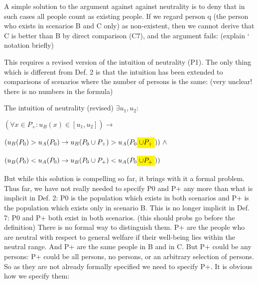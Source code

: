 A simple solution to the argument against against neutrality is to deny that in such cases all people count as existing people. If we regard person q (the person who exists in scenarios B and C only) as non-existent, then we cannot derive that C is better than B by direct comparison (C7), and the argument fails: (explain ‘ notation briefly) 
\begin{comment}
\ \ (C7’)\ \ (A1) ${\wedge}$ (A2) ${\wedge}$ (A3) \ $\Rightarrow $ \ uB(P0) {\textgreater} uC(P0) 

\ \ (C8’)\ \ (C7’) ${\wedge}$ (P1) \ $\Rightarrow $ \ uB(P0 ${\cup}$ P+) {\textgreater} uC(P0 ${\cup}$ P+) 

\ \ (C9’)\ \ (C4) \ $\Leftrightarrow $ \ (C8) 
\end{comment}
This requires a revised version of the intuition of neutrality (P1). The only thing which is different from Def. 2 is that the intuition has been extended to comparisons of scenarios where the number of persons is the same: (very unclear! there is no numbers in the formula) 

\begin{Definition}{The intuition of neutrality (revised)}{} 
$
  \exists u_1, u_2: 
$

\hspace{.5cm} $
  (\forall x \in P_+ : u_B(x) \in [u_1, u_2] )
  \rightarrow 
$

\hspace{1cm} $
  ( u_B(P_0) > u_A(P_0) 
  \rightarrow 
  u_B(P_0 \cup P_+) > u_A(P_0 \highlight{ \cup P_+}) ) 
  \ \wedge
$

\hspace{1cm} $
  ( u_B(P_0) < u_A(P_0) 
  \rightarrow 
  u_B(P_0 \cup P_+) < u_A(P_0 \highlight{ \cup P_+})) 
$
\end{Definition}

But while this solution is compelling so far, it brings with it a formal problem. Thus far, we have not really needed to specify P0 and P+ any more than what is implicit in Def. 2: P0 is the population which exists in both scenarios and P+ is the population which exists only in scenario B. This is no longer implicit in Def. 7: P0 and P+ both exist in both scenarios. (this should probs go before the definition) There is no formal way to distinguish them. P+ are the people who are neutral with respect to general welfare if their well-being lies within the neutral range. And P+ are the same people in B and in C. But P+ could be any persons: P+ could be all persons, no persons, or an arbitrary selection of persons. So as they are not already formally specified we need to specify P+. It is obvious how we specify them:  

